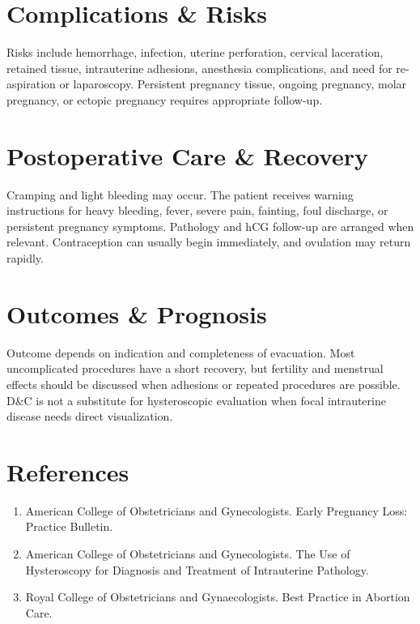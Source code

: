 \section*{Complications \& Risks}
Risks include hemorrhage, infection, uterine perforation, cervical laceration, retained tissue, intrauterine adhesions, anesthesia complications, and need for re-aspiration or laparoscopy. Persistent pregnancy tissue, ongoing pregnancy, molar pregnancy, or ectopic pregnancy requires appropriate follow-up.

\section*{Postoperative Care \& Recovery}
Cramping and light bleeding may occur. The patient receives warning instructions for heavy bleeding, fever, severe pain, fainting, foul discharge, or persistent pregnancy symptoms. Pathology and hCG follow-up are arranged when relevant. Contraception can usually begin immediately, and ovulation may return rapidly.

\section*{Outcomes \& Prognosis}
Outcome depends on indication and completeness of evacuation. Most uncomplicated procedures have a short recovery, but fertility and menstrual effects should be discussed when adhesions or repeated procedures are possible. D\&C is not a substitute for hysteroscopic evaluation when focal intrauterine disease needs direct visualization.

\section*{References}
\begin{enumerate}
  \item American College of Obstetricians and Gynecologists. Early Pregnancy Loss: Practice Bulletin.
  \item American College of Obstetricians and Gynecologists. The Use of Hysteroscopy for Diagnosis and Treatment of Intrauterine Pathology.
  \item Royal College of Obstetricians and Gynaecologists. Best Practice in Abortion Care.
\end{enumerate}

\clearpage

